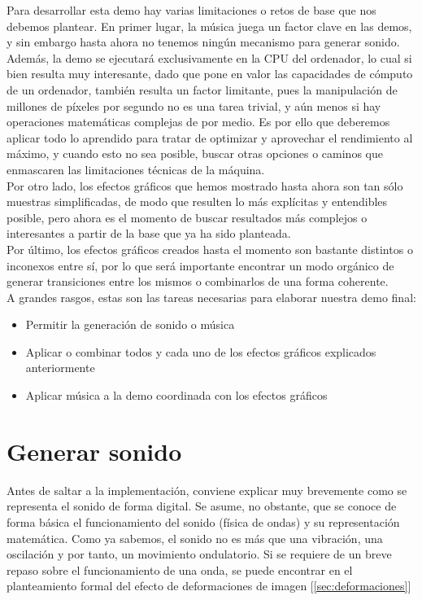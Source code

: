 Para desarrollar esta demo hay varias limitaciones o retos de base que nos debemos plantear. En primer lugar, la música juega un factor clave en las demos, y sin embargo hasta ahora no tenemos ningún mecanismo para generar sonido.\\

Además, la demo se ejecutará exclusivamente en la CPU del ordenador, lo cual si bien resulta muy interesante, dado que pone en valor las capacidades de cómputo de un ordenador, también resulta un factor limitante, pues la manipulación de millones de píxeles por segundo no es una tarea trivial, y aún menos si hay operaciones matemáticas complejas de por medio. Es por ello que deberemos aplicar todo lo aprendido para tratar de optimizar y aprovechar el rendimiento al máximo, y cuando esto no sea posible, buscar otras opciones o caminos que enmascaren las limitaciones técnicas de la máquina.\\

Por otro lado, los efectos gráficos que hemos mostrado hasta ahora son tan sólo muestras simplificadas, de modo que resulten lo más explícitas y entendibles posible, pero ahora es el momento de buscar resultados más complejos o interesantes a partir de la base que ya ha sido planteada.\\

Por último, los efectos gráficos creados hasta el momento son bastante distintos o inconexos entre sí, por lo que será importante encontrar un modo orgánico de generar transiciones entre los mismos o combinarlos de una forma coherente.\\

A grandes rasgos, estas son las tareas necesarias para elaborar nuestra demo final:

\begin{itemize}
	\item Permitir la generación de sonido o música
	\item Aplicar o combinar todos y cada uno de los efectos gráficos explicados anteriormente
	\item Aplicar música a la demo coordinada con los efectos gráficos
\end{itemize}

\section{Generar sonido}

Antes de saltar a la implementación, conviene explicar muy brevemente como se representa el sonido de forma digital. Se asume, no obstante, que se conoce de forma básica el funcionamiento del sonido (física de ondas) y su representación matemática. Como ya sabemos, el sonido no es más que una vibración, una oscilación y por tanto, un movimiento ondulatorio. Si se requiere de un breve repaso sobre el funcionamiento de una onda, se puede encontrar en el planteamiento formal del efecto de deformaciones de imagen [\ref{sec:deformaciones}]\\

